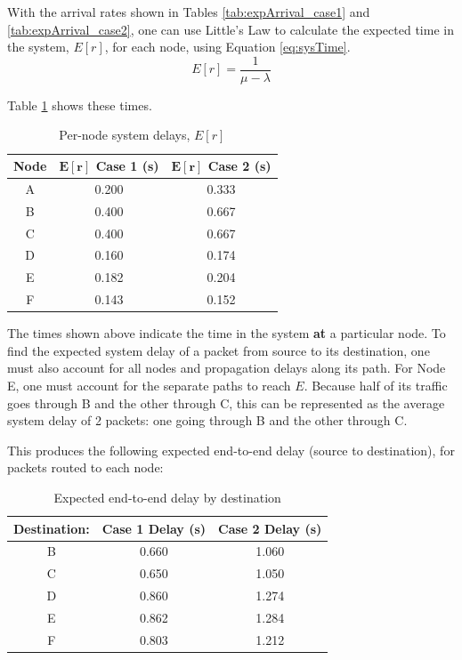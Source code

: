 \documentclass{article}
\begin{document}
With the arrival rates shown in Tables \ref{tab:expArrival_case1} and \ref{tab:expArrival_case2}, one can use Little's Law to calculate the expected time in the system, $E[r]$, for each node, using Equation \ref{eq:sysTime}.  
\begin{equation}
E[r] = \frac{1}{\mu - \lambda}
\label{eq:sysTime}
\end{equation}

Table \ref{tab:expSys} shows these times.
\newline

\begin{table}[h!]
\centering
\begin{tabular}{|c|c|c|} \hline
\textbf{Node} & \textbf{$\mathbf{E[r]}$ Case 1 (s)} & \textbf{$\mathbf{E[r]}$ Case 2 (s)} \\ \hline
A & 0.200 & 0.333 \\ \hline
B & 0.400 & 0.667 \\ \hline
C & 0.400 & 0.667 \\ \hline
D & 0.160 & 0.174 \\ \hline
E & 0.182 & 0.204 \\ \hline
F & 0.143 & 0.152 \\ \hline
\end{tabular}
\caption{Per-node system delays, $E[r]$}
\label{tab:expSys}
\end{table}

The times shown above indicate the time in the system \textbf{at} a particular node.
To find the expected system delay of a packet from source to its destination, one must also account for all nodes and propagation delays along its path.
For Node E, one must account for the separate paths to reach $E$.
Because half of its traffic goes through B and the other through C, this can be represented as the average system delay of 2 packets:  one going through B and the other through C.

This produces the following expected end-to-end delay (source to destination), for packets routed to each node:

\begin{table}[h!]
\centering
\begin{tabular}{|c|c|c|} \hline
\textbf{Destination:} & \textbf{Case 1 Delay (s)} & \textbf{Case 2 Delay (s)} \\ \hline
B & 0.660 & 1.060 \\ \hline
C & 0.650 & 1.050 \\ \hline
D & 0.860 & 1.274 \\ \hline
E & 0.862 & 1.284 \\ \hline
F & 0.803 & 1.212 \\ \hline
\end{tabular}
\caption{Expected end-to-end delay by destination}
\label{tab:expEndDelay}
\end{table}
\end{document}
